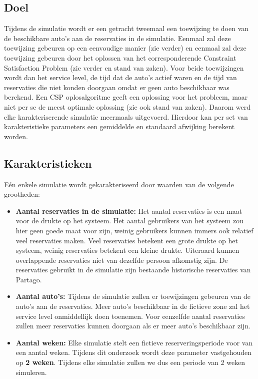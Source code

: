 \subsection{Doel}
Tijdens de simulatie wordt er een getracht tweemaal een toewijzing te doen van de beschikbare auto's aan de reservaties in de simulatie. Eenmaal zal deze toewijzing gebeuren op een eenvoudige manier (zie verder) en eenmaal zal deze toewijzing gebeuren door het oplossen van het corresponderende Constraint Satisfaction Problem (zie verder en stand van zaken). Voor beide toewijzingen wordt dan het service level, de tijd dat de auto's actief waren en de tijd van reservaties die niet konden doorgaan omdat er geen auto beschikbaar was berekend. Een CSP oplosalgoritme geeft een oplossing voor het probleem, maar niet per se de meest optimale oplossing (zie ook stand van zaken). Daarom werd elke karakteriserende simulatie meermaals uitgevoerd. Hierdoor kan per set van karakteristieke parameters een gemiddelde en standaard afwijking berekent worden. 

\subsection{Karakteristieken}
Eén enkele simulatie wordt gekarakteriseerd door waarden van de volgende grootheden:
\begin{itemize}
	\item \textbf{Aantal reservaties in de simulatie:}
	Het aantal reservaties is een maat voor de drukte op het systeem. Het aantal gebruikers van het systeem zou hier geen goede maat voor zijn, weinig gebruikers kunnen immers ook relatief veel reservaties maken. Veel reservaties betekent een grote drukte op het systeem, weinig reservaties betekent een kleine drukte. Uiteraard kunnen overlappende reservaties niet van dezelfde persoon afkomstig zijn. De reservaties gebruikt in de simulatie zijn bestaande historische reservaties van Partago.
	\item \textbf{Aantal auto's:}
	Tijdens de simulatie zullen er toewijzingen gebeuren van de auto's aan de reservaties. Meer auto's beschikbaar in de fictieve zone zal het service level onmiddellijk doen toenemen. Voor eenzelfde aantal reservaties zullen meer reservaties kunnen doorgaan als er meer auto's beschikbaar zijn. 
	\item \textbf{Aantal weken:}
	Elke simulatie stelt een fictieve reserveringsperiode voor van een aantal weken. Tijdens dit onderzoek wordt deze parameter vastgehouden op \textbf{2 weken}. Tijdens elke simulatie zullen we dus een periode van 2 weken simuleren. 
\end{itemize} 

